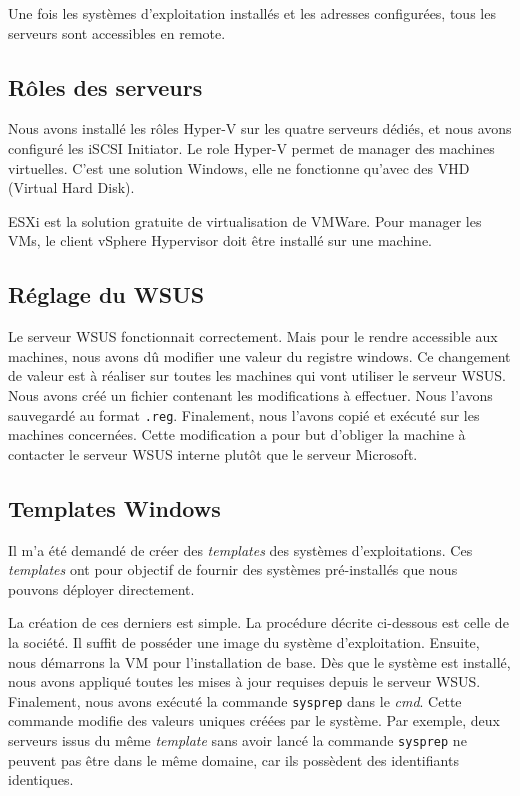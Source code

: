 Une fois les systèmes d'exploitation installés et les adresses configurées, tous les serveurs sont accessibles en remote. 

\subsection{Rôles des serveurs}
Nous avons installé les rôles Hyper-V sur les quatre serveurs dédiés, et nous avons configuré les iSCSI Initiator. 
Le role Hyper-V permet de manager des machines virtuelles. 
C'est une solution Windows, elle ne fonctionne qu'avec des VHD (Virtual Hard Disk). 

ESXi est la solution gratuite de virtualisation de VMWare. 
Pour manager les VMs, le client vSphere Hypervisor doit être installé sur une machine.

\subsection{Réglage du WSUS}
Le serveur WSUS fonctionnait correctement.
Mais pour le rendre accessible aux machines, nous avons dû modifier une valeur du registre windows.
Ce changement de valeur est à réaliser sur toutes les machines qui vont utiliser le serveur WSUS.
Nous avons créé un fichier contenant les modifications à effectuer.
Nous l'avons sauvegardé au format \texttt{.reg}.
Finalement, nous l'avons copié et exécuté sur les machines concernées. 
Cette modification a pour but d'obliger la machine à contacter le serveur WSUS interne plutôt que le serveur Microsoft. 

\subsection{Templates Windows}
Il m'a été demandé de créer des \textit{templates} des systèmes d'exploitations.
Ces \textit{templates} ont pour objectif de fournir des systèmes pré-installés que nous pouvons déployer directement.

La création de ces derniers est simple. 
La procédure décrite ci-dessous est celle de la société.
Il suffit de posséder une image du système d'exploitation.
Ensuite, nous démarrons la VM pour l'installation de base. 
Dès que le système est installé, nous avons appliqué toutes les mises à jour requises depuis le serveur WSUS. 
Finalement, nous avons exécuté la commande \texttt{sysprep} dans le \textit{cmd}.
Cette commande modifie des valeurs uniques créées par le système.
Par exemple, deux serveurs issus du même \textit{template} sans avoir lancé la commande \texttt{sysprep} ne peuvent pas être dans le même domaine, car ils possèdent des identifiants identiques. 

